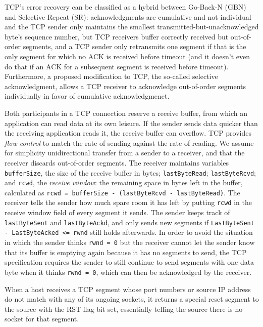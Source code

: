 \documentclass[table, xcdraw]{article}%
\begin{document}
TCP's error recovery can be classified as a hybrid between Go-Back-N (GBN) and Selective Repeat (SR): acknowledgments are cumulative and not individual and the TCP sender only maintains the smallest transmitted-but-unacknowledged byte's sequence number, but TCP receivers buffer correctly received but out-of-order segments, and a TCP sender only retransmits one segment if that is the only segment for which no ACK is received before timeout (and it doesn't even do that if an ACK for a subsequent segment is received before timeout). Furthermore, a proposed modification to TCP, the so-called selective acknowledgment, allows a TCP receiver to acknowledge out-of-order segments individually in favor of cumulative acknowledgmenet.

Both participants in a TCP connection reserve a receive buffer, from which an application can read data at its own leisure. If the sender sends data quicker than the receiving application reads it, the receive buffer can overflow. TCP provides \emph{flow control} to match the rate of sending against the rate of reading. We assume for simplicity unidirectional transfer from a sender to a receiver, and that the receiver discards out-of-order segments. The receiver maintains variables \texttt{bufferSize}, the size of the receive buffer in bytes; \texttt{lastByteRead}; \texttt{lastByteRcvd}; and \texttt{rcwd}, the \emph{receive window}: the remaining space in bytes left in the buffer, calculated as \texttt{rcwd = bufferSize - (lastByteRcvd - lastByteRead)}. The receiver tells the sender how much spare room it has left by putting \texttt{rcwd} in the receive window field of every segment it sends. The sender keeps track of \texttt{lastByteSent} and \texttt{lastByteAckd}, and only sends new segments if \texttt{LastByteSent - LastByteAcked <= rwnd} still holds afterwards. In order to avoid the situation in which the sender thinks \texttt{rwnd = 0} but the receiver cannot let the sender know that its buffer is emptying again because it has no segments to send, the TCP specification requires the sender to still continue to send segments with one data byte when it thinks \texttt{rwnd = 0}, which can then be acknowledged by the receiver.

When a host receives a TCP segment whose port numbers or source IP address do not match with any of its ongoing sockets, it returns a special reset segment to the source with the RST flag bit set, essentially telling the source there is no socket for that segment.
\end{document}
